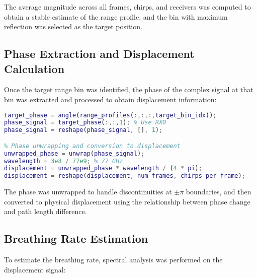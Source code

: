 \documentclass[12pt]{article}
\begin{document}
The average magnitude across all frames, chirps, and receivers was computed to obtain a stable estimate of the range profile, and the bin with maximum reflection was selected as the target position.

\subsection{Phase Extraction and Displacement Calculation}
Once the target range bin was identified, the phase of the complex signal at that bin was extracted and processed to obtain displacement information:

\begin{lstlisting}[language=Matlab]
% Extracting phase at target bin
target_phase = angle(range_profiles(:,:,:,target_bin_idx));
phase_signal = target_phase(:,:,1); % Use RX0
phase_signal = reshape(phase_signal, [], 1);

% Phase unwrapping and conversion to displacement
unwrapped_phase = unwrap(phase_signal);
wavelength = 3e8 / 77e9; % 77 GHz
displacement = unwrapped_phase * wavelength / (4 * pi);
displacement = reshape(displacement, num_frames, chirps_per_frame);
\end{lstlisting}

The phase was unwrapped to handle discontinuities at $\pm\pi$ boundaries, and then converted to physical displacement using the relationship between phase change and path length difference.

\subsection{Breathing Rate Estimation}
To estimate the breathing rate, spectral analysis was performed on the displacement signal:
\end{document}
